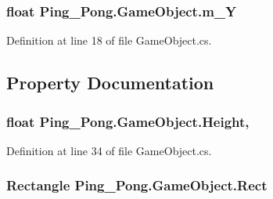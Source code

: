 \hypertarget{class_ping___pong_1_1_game_object_a29466cb57b6ac26e58052b2517083745}{
\subsubsection[{m\-\_\-\-Y}]{\setlength{\rightskip}{0pt plus 5cm}float Ping\-\_\-\-Pong.\-Game\-Object.\-m\-\_\-\-Y\hspace{0.3cm}{\ttfamily [protected]}}}\label{class_ping___pong_1_1_game_object_a29466cb57b6ac26e58052b2517083745}


Definition at line 18 of file Game\-Object.\-cs.



\subsection{Property Documentation}
\hypertarget{class_ping___pong_1_1_game_object_a66385f8db21929ffb9fa7f180db54f95}{
\subsubsection[{Height}]{\setlength{\rightskip}{0pt plus 5cm}float Ping\-\_\-\-Pong.\-Game\-Object.\-Height\hspace{0.3cm}{\ttfamily [get]}, {\ttfamily [set]}}}\label{class_ping___pong_1_1_game_object_a66385f8db21929ffb9fa7f180db54f95}


Definition at line 34 of file Game\-Object.\-cs.

\hypertarget{class_ping___pong_1_1_game_object_a2f69360b5ba37b1ebb3cc324244060c2}{
\subsubsection[{Rect}]{\setlength{\rightskip}{0pt plus 5cm}Rectangle Ping\-\_\-\-Pong.\-Game\-Object.\-Rect\hspace{0.3cm}{\ttfamily [get]}}}\label{class_ping___pong_1_1_game_object_a2f69360b5ba37b1ebb3cc324244060c2}


